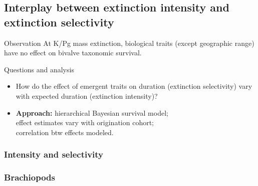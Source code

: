 \documentclass{beamer}
\begin{document}
\subsection{Interplay between extinction intensity and extinction selectivity}

\begin{frame}
  \begin{alertblock}{Observation}
    At K/Pg mass extinction, biological traits (except geographic range) have no effect on \alert{bivalve} taxonomic survival.
  \end{alertblock}

\end{frame}

\begin{frame}
  \begin{alertblock}{Questions and analysis}
    \begin{itemize}
      \item How do the effect of emergent traits on duration (\alert{extinction selectivity}) vary with expected duration (\alert{extinction intensity})?
      \item \textbf{Approach:} hierarchical Bayesian survival model; \\effect estimates vary with origination cohort; \\correlation btw effects modeled.
    \end{itemize}
  \end{alertblock}
\end{frame}

\begin{frame}
  \frametitle{Intensity and selectivity}
  \begin{center}
  \end{center}
\end{frame}

\begin{frame}
  \frametitle{Brachiopods}

  \footnotesize{}
\end{frame}
\end{document}
